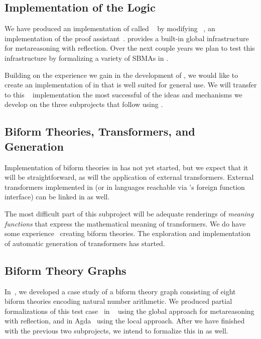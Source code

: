 \documentclass[fleqn]{llncs}
\begin{document}
\subsection*{Implementation of the Logic}

We have produced an implementation of {\churchqe} called
{\HLQE}~\cite{CaretteFarmerLaskowski18} by modifying
{\HL}~\cite{Harrison09}, an implementation of the {\HOL} proof
assistant~\cite{GordonMelham93}.  {\HLQE} provides a built-in global
infrastructure for metareasoning with reflection.  Over the next
couple years we plan to test this infrastructure by formalizing a
variety of SBMAs in {\HLQE}.

Building on the experience we gain in the development of {\HLQE}, we
would like to create an implementation of {\churchqe} in {\MMT} that
is well suited for general use.  We will transfer to this
{\MMT}~\cite{RabeKohlhase13} implementation the most successful of the
ideas and mechanisms we develop on the three subprojects that follow
using {\HLQE}.

\subsection*{Biform Theories, Transformers, and Generation}

Implementation of biform theories in {\HLQE} has not yet started, but
we expect that it will be straightforward, as will the application of
external transformers.  External transformers implemented in {\OCAML}
(or in languages reachable via {\OCAML}'s foreign function interface)
can be linked in as well.

The most difficult part of this subproject will be adequate renderings
of \emph{meaning functions} that express the mathematical meaning of
transformers. We do have some
experience~\cite{CaretteFarmer17,CaretteFarmerSorge07} creating biform
theories.  The exploration and implementation of automatic generation
of transformers has started.

\subsection*{Biform Theory Graphs}

In~\cite{CaretteFarmer17}, we developed a case study of a biform
theory graph consisting of eight biform theories encoding natural number
arithmetic.  We produced partial formalizations of this test
case~\cite{CaretteFarmer17} in {\churchuqe}~\cite{Farmer17} using the
global approach for metareasoning with reflection, and in
Agda~\cite{Norell07,Norell09} using the local approach.  After we have
finished with the previous two subprojects, we intend to formalize this
in {\HLQE} as well.
\end{document}
